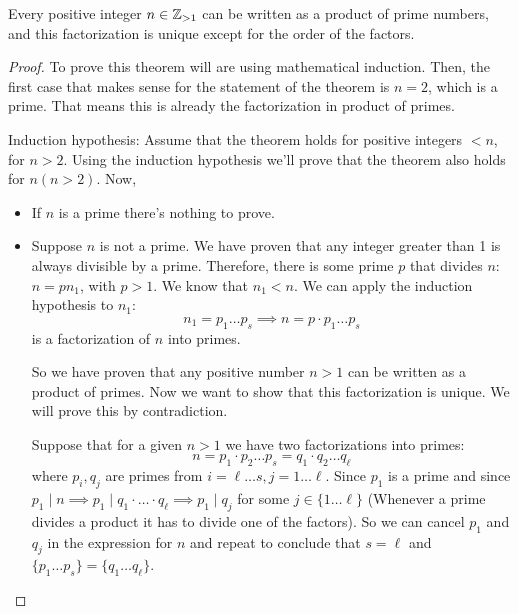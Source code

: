 \begin{theorem}
    Every positive integer $n\in\mathbb{Z}_{>1}$ can be written as
    a product of prime numbers, and this factorization is unique except for the order of the factors.
\end{theorem}

\begin{proof}
    To prove this theorem will are using mathematical induction. Then, the first case that makes sense
    for the statement of the theorem is $n = 2$, which is a prime. That means this is already the
    factorization in product of primes.

    Induction hypothesis: Assume that the theorem holds for positive integers $< n$, for $n > 2$. Using
    the induction hypothesis we'll prove that the theorem also holds for $n \left( n > 2 \right) $. Now,
    \begin{itemize}[itemsep = -2pt]
        \item If $n$ is a prime there's nothing to prove.
        \item Suppose $n$ is not a prime. We have proven that any integer greater than 1 is always
            divisible by a prime. Therefore, there is some prime $p$ that divides $n$: $n = pn_1$,
            with $p > 1$. We know that $n_1 < n$. We can apply the induction hypothesis to $n_1$:
            \begin{equation}
                n_1 = p_1\ldots p_s\implies n = p\cdot p_1\ldots p_s
            \end{equation}
            is a factorization of $n$ into primes.

            So we have proven that any positive number $n > 1$ can be written as a product of primes.
            Now we want to show that this factorization is unique. We will prove this by contradiction.

            Suppose that for a given $n > 1$ we have two factorizations into primes:
            \begin{equation}
                n = p_1\cdot p_2\ldots p_s = q_1\cdot q_2\ldots q_\ell
            \end{equation}
            where $p_i, q_j$ are primes from $i = \ell\ldots s, j = 1\ldots\ell$. Since $p_1$ is a prime
            and since $p_1\mid n\implies p_1\mid q_1\cdot \ldots\cdot q_\ell\implies p_1\mid q_j$ for some
            $j\in \{1\ldots\ell\} $ (Whenever a prime divides a product it has to divide one of the factors).
            So we can cancel $p_1$ and $q_j$ in the expression for $n$ and repeat to conclude that $s = \ell$
            and $\{p_1\ldots p_s\} = \{q_1\ldots q_\ell\} $.
    \end{itemize}
\end{proof}

